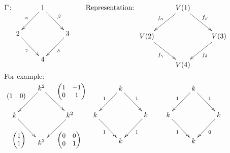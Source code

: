 \begin{exam}
\(\Gamma\colon \xymatrix{ & 1\ar[dl]_\alpha \ar[dr]^\beta & \\
    2\ar[dr]_{\gamma} & & 3 \ar[dl]^\delta \\
    & 4 & }
    \quad\quad \text{Representation: }\xymatrix{ & V(1)\ar[dl]_{f_\alpha} \ar[dr]^{f_\beta} & \\
    V(2)\ar[dr]_{f_\gamma} & & V(3) \ar[dl]^{f_\delta} \\
    & V(4) & }\)\\
    For example:\\
\(\xymatrix{ & k^2\ar[dl]_{\small\begin{pmatrix} 1 & 0 \end{pmatrix}} \ar[dr]^{\small\begin{pmatrix} 1 & -1 \\ 0 & 1 \end{pmatrix}} & \\
    k\ar[dr]_{\small\begin{pmatrix} 1 \\ 1 \end{pmatrix}} & & k^2 \ar[dl]^{\small\begin{pmatrix} 0 & 0\\ 0 & 1 \end{pmatrix}}\\
    & k^2 & }\)\quad\quad
    \(\xymatrix{ & k\ar[dl]_{1} \ar[dr]^{1} & \\
    k\ar[dr]_{1} & & k \ar[dl]^{1}\\
    & k & }\quad\quad
\xymatrix{ & k\ar[dl]_{1} \ar[dr]^{1} & \\
    k\ar[dr]_{1} & & k \ar[dl]^{0}\\
    & k & }\)
\end{exam}
